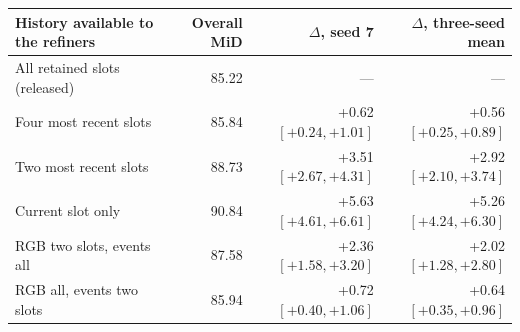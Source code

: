 \begin{tabular}{lrrr}
\toprule
History available to the refiners & Overall MiD & $\Delta$, seed 7 & $\Delta$, three-seed mean \\
\midrule
All retained slots (released) & 85.22 & --- & --- \\
Four most recent slots & 85.84 & +0.62 $[+0.24,+1.01]$ & +0.56 $[+0.25,+0.89]$ \\
Two most recent slots & 88.73 & +3.51 $[+2.67,+4.31]$ & +2.92 $[+2.10,+3.74]$ \\
Current slot only & 90.84 & +5.63 $[+4.61,+6.61]$ & +5.26 $[+4.24,+6.30]$ \\
RGB two slots, events all & 87.58 & +2.36 $[+1.58,+3.20]$ & +2.02 $[+1.28,+2.80]$ \\
RGB all, events two slots & 85.94 & +0.72 $[+0.40,+1.06]$ & +0.64 $[+0.35,+0.96]$ \\
\bottomrule
\end{tabular}
